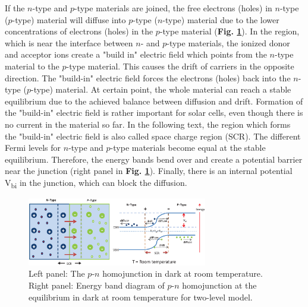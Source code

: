 \documentclass[a4paper, 12pt, titlepage,oneside,drop]{kthesis}
\begin{document}
If the $n$-type and $p$-type materials are joined, the free electrons (holes) in $n$-type ($p$-type) material will diffuse into $p$-type ($n$-type) material due to the
lower concentrations of electrons (holes) in the $p$-type material (\textbf{Fig. \ref{pnjunction}}). In the region, which is near the interface between $n$- and $p$-type materials, the ionized donor and acceptor ions create a
"build in" electric field which points from the $n$-type material to the $p$-type material. This causes the drift of carriers in the opposite direction. The "build-in" electric field forces the electrons (holes) back into
the $n$-type ($p$-type) material. At certain point, 
the whole material can reach a stable equilibrium due to the achieved balance between diffusion and drift. Formation of the "build-in" electric field is rather important for solar cells, even though there is no current in 
the material so far. In the following text, the region which forms the "build-in" electric field is also called space charge region (SCR). The different Fermi levels for $n$-type and $p$-type materials become
equal at the stable equilibrium. Therefore, the energy bands bend over and create a potential barrier near the junction (right panel in \textbf{Fig. \ref{pnjunction}}). Finally, there is an internal potential V\textsubscript{bi}
in the junction, which can block the diffusion.

\begin{figure}[H]
    \begin{center}
            \includegraphics[width=0.7\textwidth]{pnjunction.eps}
     \end{center}
    \caption{Left panel: The $p$-$n$ homojunction in dark at room temperature. Right panel: Energy band diagram of $p$-$n$ homojunction at the equilibrium in dark at room temperature for two-level model. }      
    \label{pnjunction}
\end{figure}
\end{document}
